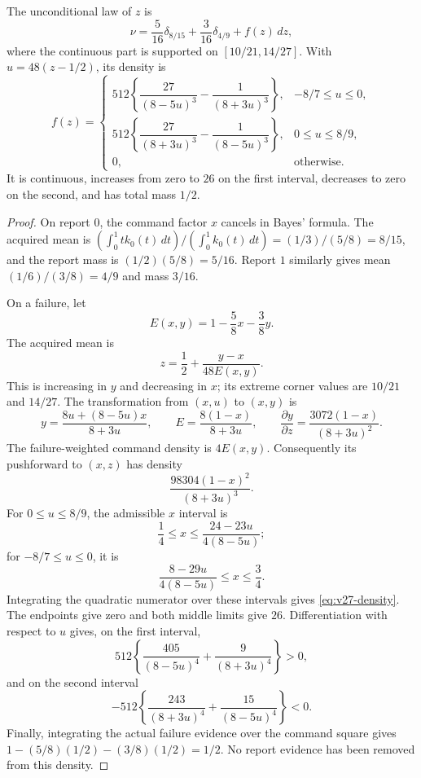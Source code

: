 \begin{proposition}
\label{prop:v27-density}
The unconditional law of $z$ is
\begin{equation}\label{eq:v27-full-law}
 \nu=\frac5{16}\delta_{8/15}+\frac3{16}\delta_{4/9}+f(z)\,dz,
\end{equation}
where the continuous part is supported on $[10/21,14/27]$. With $u=48(z-1/2)$, its density is
\begin{equation}\label{eq:v27-density}
 f(z)=
 \begin{cases}
 512\left\{\dfrac{27}{(8-5u)^3}-\dfrac1{(8+3u)^3}\right\},
                                      &-8/7\le u\le0,\\[6pt]
 512\left\{\dfrac{27}{(8+3u)^3}-\dfrac1{(8-5u)^3}\right\},
                                      &0\le u\le8/9,\\[4pt]
 0,&\text{otherwise}.
 \end{cases}
\end{equation}
It is continuous, increases from zero to $26$ on the first interval, decreases to zero on the second, and has total mass $1/2$.
\end{proposition}
\begin{proof}
On report $0$, the command factor $x$ cancels in Bayes' formula. The acquired mean is $(\int_0^1tk_0(t)\,dt)/(\int_0^1k_0(t)\,dt)=(1/3)/(5/8)=8/15$, and the report mass is $(1/2)(5/8)=5/16$. Report $1$ similarly gives mean $(1/6)/(3/8)=4/9$ and mass $3/16$.

On a failure, let
\[
             E(x,y)=1-\frac58x-\frac38y.
\]
The acquired mean is
\begin{equation}\label{eq:v27-failure-mean}
               z=\frac12+\frac{y-x}{48E(x,y)}.
\end{equation}
This is increasing in $y$ and decreasing in $x$; its extreme corner values are $10/21$ and $14/27$. The transformation from $(x,u)$ to $(x,y)$ is
\[
 y=\frac{8u+(8-5u)x}{8+3u},\qquad
 E=\frac{8(1-x)}{8+3u},\qquad
 \frac{\partial y}{\partial z}
                        =\frac{3072(1-x)}{(8+3u)^2}.
\]
The failure-weighted command density is $4E(x,y)$. Consequently its pushforward to $(x,z)$ has density
\[
                         \frac{98304(1-x)^2}{(8+3u)^3}.
\]
For $0\le u\le8/9$, the admissible $x$ interval is
\[
       \frac14\le x\le\frac{24-23u}{4(8-5u)};
\]
for $-8/7\le u\le0$, it is
\[
       \frac{8-29u}{4(8-5u)}\le x\le\frac34.
\]
Integrating the quadratic numerator over these intervals gives \eqref{eq:v27-density}. The endpoints give zero and both middle limits give $26$. Differentiation with respect to $u$ gives, on the first interval,
\[
 512\left\{\frac{405}{(8-5u)^4}+\frac9{(8+3u)^4}\right\}>0,
\]
and on the second interval
\[
 -512\left\{\frac{243}{(8+3u)^4}+\frac{15}{(8-5u)^4}\right\}<0.
\]
Finally, integrating the actual failure evidence over the command square gives $1-(5/8)(1/2)-(3/8)(1/2)=1/2$. No report evidence has been removed from this density.
\end{proof}

